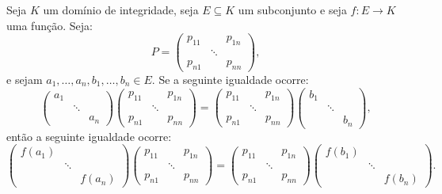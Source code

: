 \documentclass[11pt,a4paper]{article}
\begin{document}
\begin{exercicio}\label{blah}
Seja $K$ um domínio de integridade, seja $E\subseteq K$ um subconjunto e seja $f:E\rightarrow K$ uma função. Seja:
\[
P=\begin{pmatrix}
p_{11}&&p_{1n}\\&\ddots&\\p_{n1}&&p_{nn}
\end{pmatrix},
\]
e sejam $a_1,\dots,a_n,b_1,\dots,b_n\in E$. Se a seguinte igualdade ocorre:
\[
\begin{pmatrix}
a_1&&\\&\ddots&\\&&a_n
\end{pmatrix}
\begin{pmatrix}
p_{11}&&p_{1n}\\&\ddots&\\p_{n1}&&p_{nn}
\end{pmatrix}=
\begin{pmatrix}
p_{11}&&p_{1n}\\&\ddots&\\p_{n1}&&p_{nn}
\end{pmatrix}
\begin{pmatrix}
b_1&&\\&\ddots&\\&&b_n
\end{pmatrix},
\]
então a seguinte igualdade ocorre:
\[
\begin{pmatrix}
f(a_1)&&\\&\ddots&\\&&f(a_n)
\end{pmatrix}
\begin{pmatrix}
p_{11}&&p_{1n}\\&\ddots&\\p_{n1}&&p_{nn}
\end{pmatrix}=
\begin{pmatrix}
p_{11}&&p_{1n}\\&\ddots&\\p_{n1}&&p_{nn}
\end{pmatrix}
\begin{pmatrix}
f(b_1)&&\\&\ddots&\\&&f(b_n)
\end{pmatrix}.
\]
\end{exercicio}
\end{document}
